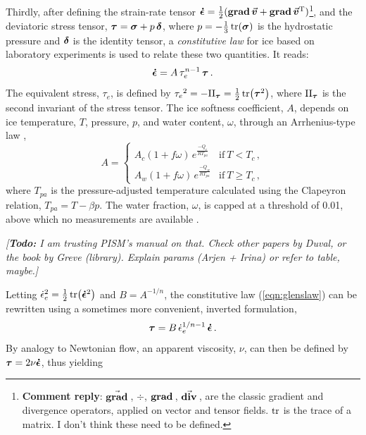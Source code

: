 \documentclass{article}
\newcommand{\renote}[1]{\footnote{\textbf{Comment reply}: #1}}
\newcommand{\todo}[1]{\emph{[\textbf{Todo:} #1]}}
\newcommand{\vect}[1]{\va*{#1}} %
\newcommand{\tens}[1]{\vb*{#1}} %
\renewcommand{\div}[1]{\mathrm{div}\,#1}            %
\renewcommand{\grad}[1]{\vect{\mathrm{grad}}\,#1}   %
\newcommand{\tdiv}[1]{\vect{\mathrm{div}}\,#1}      %
\newcommand{\tgrad}[1]{\tens{\mathrm{grad}}\,#1}    %
\newcommand{\doteps}[0]{\dot{\epsilon}} %
\newcommand{\IDT}[0]{\tens{\delta}}     %
\newcommand{\CST}[0]{\tens{\sigma}}     %
\newcommand{\DST}[0]{\tens{\tau}}       %
\newcommand{\SRT}[0]{\tens{\doteps}}    %
\newcommand{\vv}[0]{\vect{v}}           %
\begin{document}
Thirdly, after defining the strain-rate tensor
${\SRT = \frac{1}{2}(\tgrad{\vv} + \tgrad{\vv}^{\mathrm{T}})}$\renote{
  $\grad$, $\div$, $\tgrad$, $\tdiv$, are the classic gradient and divergence operators, applied on vector and tensor fields. $\tr$ is the trace of a matrix. I don't think these need to be defined.},
and the deviatoric stress tensor, ${\DST = \CST + p\,\IDT}$,
where $p=-\frac{1}{3}\tr(\CST)$ is the hydrostatic pressure and
$\tens{\delta}$ is the identity tensor, a \emph{constitutive law} for ice
\citep{Nye.1953} based on laboratory experiments \citep{Glen.1952} is used to
relate these two quantities. It reads:
\begin{equation}
    \label{eqn:glenslaw}
    \SRT = A\,\tau_e^{n-1}\,\DST \,.
\end{equation}
The equivalent stress, $\tau_e$, is defined by
${\tau_e}^2 = -\mathrm{II}_{\DST} = \frac{1}{2} \tr(\DST^2)$,
where $\mathrm{II}_{\DST}$ is the second invariant of the stress tensor.
The ice softness coefficient, $A$, depends on ice temperature, $T$, pressure, $p$, and
water content, $\omega$, through an Arrhenius-type law
\citep[Eqs.~63--65]{Aschwanden.etal.2012},
\begin{equation}
    A =
    \begin{cases}
        A_c (1+f\omega)\,e^\frac{-Q_c}{RT_{pa}}
            & \text{if}\ T < T_c \,, \\
        A_w (1+f\omega)\,e^\frac{-Q_w}{RT_{pa}}
            & \text{if}\ T \ge T_c \,,
    \end{cases}
\end{equation}
where $T_{pa}$ is the pressure-adjusted temperature calculated using the
Clapeyron relation, ${T_{pa} = T - \beta p}$. The water fraction, $\omega$, is
capped at a threshold of 0.01, above which no measurements are available
\citep{Lliboutry.Duval.1985}.

\todo{I am trusting PISM's manual on that. Check other papers by Duval, or
      the book by Greve (library). Explain params (Arjen + Irina) or refer to
      table, maybe.}

Letting ${\doteps_e}^2 = \frac{1}{2} \tr(\SRT^2)$ and $B=A^{-1/n}$, the
constitutive law (\ref{eqn:glenslaw}) can be rewritten using a sometimes more
convenient, inverted formulation,
\begin{equation}
    \label{eqn:invglenslaw}
    \DST = B\,\doteps_e^{1/n-1}\,\SRT \,.
\end{equation}
By analogy to Newtonian flow, an apparent viscosity, $\nu$, can then be defined
by $\DST = 2 \nu\SRT$, thus yielding
\end{document}
